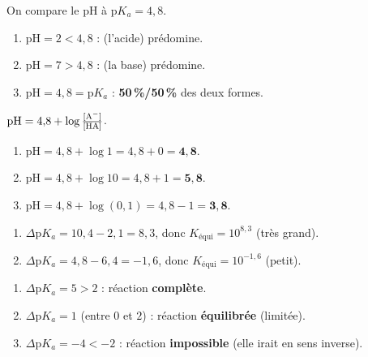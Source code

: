 \documentclass[11pt,a4paper]{article}
\begin{document}

\begin{corrige}
On compare le pH à $\mathrm{p}K_a = 4{,}8$.
\begin{enumerate}[label=\alph*)]
  \item $\mathrm{pH} = 2 < 4{,}8$ : \textbf{} (l'acide) prédomine.
  \item $\mathrm{pH} = 7 > 4{,}8$ : \textbf{} (la base) prédomine.
  \item $\mathrm{pH} = 4{,}8 = \mathrm{p}K_a$ : \textbf{50\,\%/50\,\%} des deux formes.
\end{enumerate}
\end{corrige}

\begin{corrige}
$\mathrm{pH} = 4{,}8 + \log\frac{[\ce{A-}]}{[\ce{HA}]}$.
\begin{enumerate}[label=\alph*)]
  \item $\mathrm{pH} = 4{,}8 + \log 1 = 4{,}8 + 0 = \mathbf{4{,}8}$.
  \item $\mathrm{pH} = 4{,}8 + \log 10 = 4{,}8 + 1 = \mathbf{5{,}8}$.
  \item $\mathrm{pH} = 4{,}8 + \log(0{,}1) = 4{,}8 - 1 = \mathbf{3{,}8}$.
\end{enumerate}
\end{corrige}

\begin{corrige}
\begin{enumerate}[label=\alph*)]
  \item $\Delta\mathrm{p}K_a = 10{,}4 - 2{,}1 = 8{,}3$, donc $K_{\text{équi}} = 10^{8{,}3}$ (très grand).
  \item $\Delta\mathrm{p}K_a = 4{,}8 - 6{,}4 = -1{,}6$, donc $K_{\text{équi}} = 10^{-1{,}6}$ (petit).
\end{enumerate}
\end{corrige}

\begin{corrige}
\begin{enumerate}[label=\alph*)]
  \item $\Delta\mathrm{p}K_a = 5 > 2$ : réaction \textbf{complète}.
  \item $\Delta\mathrm{p}K_a = 1$ (entre $0$ et $2$) : réaction \textbf{équilibrée} (limitée).
  \item $\Delta\mathrm{p}K_a = -4 < -2$ : réaction \textbf{impossible} (elle irait en sens inverse).
\end{enumerate}
\end{corrige}
\end{document}
